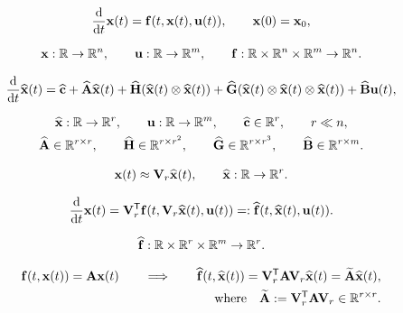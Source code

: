 \documentclass[12 pt]{article}
\begin{document}
\begin{align*}
    \ddt\xfom(t)
    = \ffom(t,\xfom(t),\ufom(t)),
    \qquad
    \xfom(0)
    = \xfom_0,
\end{align*}

\begin{align*}
    \xfom:\RR\to\RR^{n},
    \qquad
    \ufom:\RR\to\RR^{m},
    \qquad
    \ffom:\RR\times\RR^{n}\times\RR^{m}\to\RR^{n}.
\end{align*}

\begin{align*}
    \ddt\xrom(t)
    = \crom
    + \Arom\xrom(t)
    + \Hrom(\xrom(t)\otimes\xrom(t))
    + \Grom(\xrom(t)\otimes\xrom(t)\otimes\xrom(t))
    + \Brom\ufom(t),
\end{align*}

\begin{gather*}
    \xrom:\RR\to\RR^{r},
    \qquad
    \ufom:\RR\to\RR^{m},
    \qquad
    \crom\in\RR^{r},
    \qquad
    r \ll n,
    \\
    \Arom\in\RR^{r \times r},
    \qquad
    \Hrom\in\RR^{r \times r^2},
    \qquad
    \Grom\in\RR^{r \times r^3},
    \qquad
    \Brom\in\RR^{r \times m}.
\end{gather*}

\begin{align*}
    \xfom(t)
    \approx \Vr\xrom(t),
    \qquad
    \xrom:\RR\to\RR^{r}.
\end{align*}

\begin{align*}
    \ddt\xfom(t)
    = \Vr\trp\ffom(t,\Vr\xrom(t),\ufom(t))
    =: \from(t,\xrom(t),\ufom(t)).
\end{align*}

\begin{align*}
    \from:\RR\times\RR^{r}\times\RR^{m}\to\RR^{r}.
\end{align*}

\begin{align*}
    \ffom(t,\xfom(t)) = \Afom\xfom(t)
    \qquad\Longrightarrow\qquad
    \from(t,\xrom(t)) = \Vr\trp\Afom\Vr\xrom(t) = \intrusive{\Afom}\xrom(t),
    \\
    \text{where}\quad
    \intrusive{\Afom}
    := \Vr\trp\Afom\Vr\in\RR^{r \times r}.
\end{align*}
\end{document}
